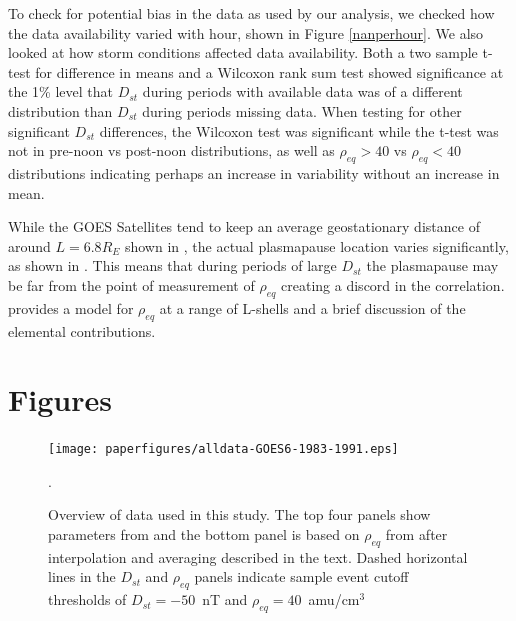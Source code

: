 \documentclass[10pt,twocolumn]{article}
\begin{document}
To check for potential bias in the data as used by our analysis, we checked how the data availability varied with hour, shown in Figure \ref{nanperhour}. We also looked at how storm conditions affected data availability. Both a two sample t-test for difference in means and a Wilcoxon rank sum test showed significance at the 1\% level that $D_{st}$ during periods with available data was of a different distribution than $D_{st}$ during periods missing data. When testing for other significant $D_{st}$ differences, the Wilcoxon test was significant while the t-test was not in pre-noon vs post-noon distributions, as well as $\rho_{eq}>40$ vs $\rho_{eq}<40$ distributions indicating perhaps an increase in variability without an increase in mean.

While the GOES Satellites tend to keep an average geostationary distance of around $L=6.8R_E$ shown in \cite{Takahashi2010}, the actual plasmapause location varies significantly, as shown in \cite{OBrien2003}. This means that during periods of large $D_{st}$ the plasmapause may be far from the point of measurement of $\rho_{eq}$ creating a discord in the correlation. \cite{Gallagher2000} provides a model for $\rho_{eq}$ at a range of L-shells and a brief discussion of the elemental contributions.

\newpage
\footnotesize



\clearpage
\section{Figures}

\begin{figure}[htp!]
\centering
\texttt{[image: paperfigures/alldata-GOES6-1983-1991.eps]}
\caption{Overview of data used in this study. The top four panels show parameters from \cite{Reconstruction} and the bottom panel is based on $\rho_{eq}$ from \cite{Denton} after interpolation and averaging described in the text. Dashed horizontal lines in the $D_{st}$ and $\rho_{eq}$ panels indicate sample event cutoff thresholds of $D_{st}=-50$~nT and $\rho_{eq}=40$~amu/cm$^3$}.
\label{AllData}
\end{figure}
\end{document}
